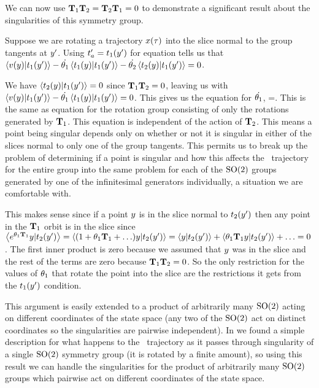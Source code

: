 {We can now use $\mathbf{T}_1 \mathbf{T}_2=\mathbf{T}_2 \mathbf{T}_1=0$ to demonstrate a significant result about the singularities of this symmetry group.

Suppose we are rotating a trajectory $x(\tau)$ into the slice normal to the group tangents at ${y'}$. Using $t'_{a}=t_1({y'})$ for equation  tells us that
$\left\langle {\ensuremath{v}(\ensuremath{y})}|{t_1({y'})} \right\rangle-\dot{{\bf \theta}_1} \left\langle { \ensuremath{t}_1(\ensuremath{y})}|{t_1({y'})} \right\rangle-\dot{{\bf \theta}_2} \left\langle { \ensuremath{t}_2(\ensuremath{y})}|{t_1({y'})} \right\rangle=0$.

We have
$\left\langle {\ensuremath{t}_2(\ensuremath{y})}|{t_1({y'})} \right\rangle=0$ since $\mathbf{T}_1 \mathbf{T}_2=0$,
leaving us with $\left\langle {\ensuremath{v}(\ensuremath{y})}|{t_1({y'})} \right\rangle-\dot{{\bf \theta}_1}\left\langle {\ensuremath{t}_1(\ensuremath{y})}|{t_1({y'})} \right\rangle=0$. This gives us the equation for $\dot{{\bf \theta}_1}$,
\beq
{}=.
\eeq
This is the same as equation  for the rotation group consisting of only the rotations generated by $\mathbf{T}_1$. This equation is independent of the action of $\mathbf{T}_2$. This means a point being singular depends only on whether or not it is singular in either of the slices normal to only one of the group tangents. This permits us to break up the problem of determining if a point is singular and how this affects the \reducedsp\ trajectory for the entire group into the same problem for each of the $\textrm{SO}(2)$ groups generated by one of the infinitesimal generators individually, a situation we are comfortable with.

This makes sense since if a point $y$ is in the slice normal to $t_2({y'})$ then any point in the $\mathbf{T}_1$ orbit is in the slice since $\left\langle {e^{\ensuremath{{\bf \theta}}_1 \ensuremath{\mathbf{T}}_1}\ensuremath{y}}|{t_2({y'})} \right\rangle=\left\langle {(1+\ensuremath{{\bf \theta}}_1 \ensuremath{\mathbf{T}}_1+\ldots)\ensuremath{y}}|{t_2({y'})} \right\rangle=\left\langle {\ensuremath{y}}|{t_2({y'})} \right\rangle+\left\langle {\ensuremath{{\bf \theta}}_1 \ensuremath{\mathbf{T}}_1 \ensuremath{y}}|{t_2({y'})} \right\rangle+\ldots=0$. The first inner product is zero because we assumed that $y$ was in the slice and the rest of the terms are zero because $\mathbf{T}_1 \mathbf{T}_2=0$. So the only restriction for the values of ${\bf \theta}_1$ that rotate the point into the slice are the restrictions it gets from the $t_1({y'})$ condition.

This argument is easily extended to a product of arbitrarily many $\textrm{SO}(2)$ acting on different coordinates of the state space (any two of the $\textrm{SO}(2)$ act on distinct coordinates so the singularities are pairwise independent).
In  we found a simple description for what happens to the \reducedsp\ trajectory as it passes through singularity of a single $\textrm{SO}(2)$ symmetry group (it is rotated by a finite amount), so using this result we can handle the singularities for the product of arbitrarily many $\textrm{SO}(2)$ groups which pairwise act on different coordinates of the state space.


}
